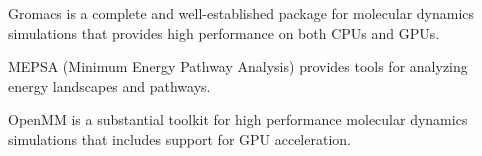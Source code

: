 Gromacs \cite{Pronk_2013} is a complete and well-established package for molecular dynamics simulations that provides high performance on both CPUs and GPUs.

MEPSA (Minimum Energy Pathway Analysis) \cite{Marcos_Alcalde_2015} provides tools for analyzing energy landscapes and pathways.

OpenMM  \cite{Eastman_2013} is a substantial toolkit for high performance molecular dynamics simulations that includes support for GPU acceleration.